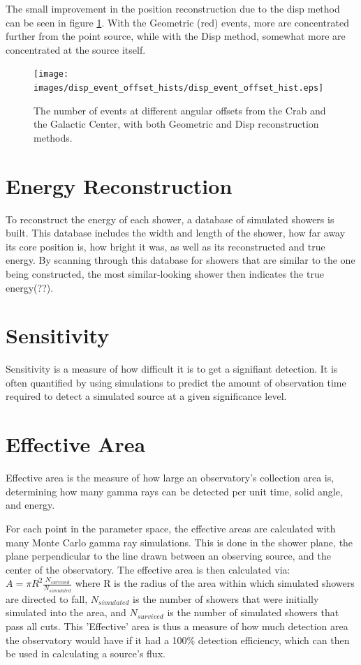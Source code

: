 The small improvement in the position reconstruction due to the disp method can be seen in figure \ref{fig:disp_event_offset}.
With the Geometric (red) events, more are concentrated further from the point source, while with the Disp method, somewhat more are concentrated at the source itself.

\begin{figure}[ht]
  \begin{center}
    \texttt{[image: images/disp\_event\_offset\_hists/disp\_event\_offset\_hist.eps]}
    \caption[DISP Offset Improvement]{The number of events at different angular offsets from the Crab and the Galactic Center, with both Geometric and Disp reconstruction methods.}\label{fig:disp_event_offset}
  \end{center}
\end{figure}

\section{Energy Reconstruction}\label{subsec:enrecon}
To reconstruct the energy of each shower, a database of simulated showers is built.
This database includes the width and length of the shower, how far away its core position is, how bright it was, as well as its reconstructed and true energy.
By scanning through this database for showers that are similar to the one being constructed, the most similar-looking shower then indicates the true energy(??).



\section{Sensitivity}
Sensitivity is a measure of how difficult it is to get a signifiant detection.
It is often quantified by using simulations to predict the amount of observation time required to detect a simulated source at a given significance level.


\section{Effective Area}
Effective area is the measure of how large an observatory's collection area is, determining how many gamma rays can be detected per unit time, solid angle, and energy.

For each point in the parameter space, the effective areas are calculated with many Monte Carlo gamma ray simulations.
This is done in the shower plane, the plane perpendicular to the line drawn between an observing source, and the center of the observatory.
The effective area is then calculated via:
$A=\pi R^2 \frac{N_{survived}}{N_{simulated}}$
where R is the radius of the area within which simulated showers are directed to fall, $N_{simulated}$ is the number of showers that were initially simulated into the area, and $N_{survived}$ is the number of simulated showers that pass all cuts.
This 'Effective' area is thus a measure of how much detection area the observatory would have if it had a 100\% detection efficiency, which can then be used in calculating a source's flux.

